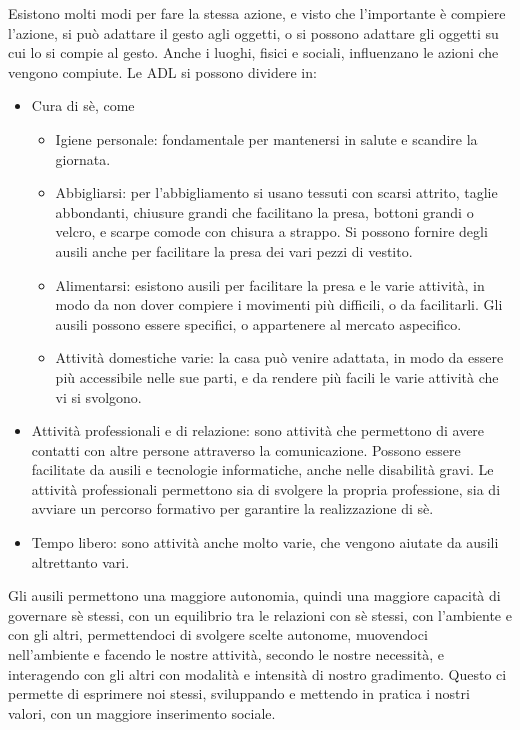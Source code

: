 Esistono molti modi per fare la stessa azione, e visto che l'importante è compiere l'azione, si può adattare il gesto agli oggetti, o si
possono adattare gli oggetti su cui lo si compie al gesto. Anche i luoghi, fisici e sociali, influenzano le azioni che vengono compiute.
Le ADL si possono dividere in:
\begin{itemize}
\item Cura di sè, come
	\begin{itemize}
	\item Igiene personale: fondamentale per mantenersi in salute e scandire la giornata.
	\item Abbigliarsi: per l'abbigliamento si usano tessuti con scarsi attrito, taglie abbondanti, chiusure grandi che facilitano la
  presa, bottoni grandi o velcro, e scarpe comode con chisura a strappo. Si possono fornire degli ausili anche per facilitare la presa
  dei vari pezzi di vestito.
	\item Alimentarsi: esistono ausili per facilitare la presa e le varie attività, in modo da non dover compiere i movimenti più
  difficili, o da facilitarli. Gli ausili possono essere specifici, o appartenere al mercato aspecifico.
	\item Attività domestiche varie: la casa può venire adattata, in modo da essere più accessibile nelle sue parti, e da rendere più
  facili le varie attività che vi si svolgono.
	\end{itemize}
\item Attività professionali e di relazione: sono attività che permettono di avere contatti con altre persone attraverso la
comunicazione. Possono essere facilitate da ausili e tecnologie informatiche, anche nelle disabilità gravi. Le attività professionali
permettono sia di svolgere la propria professione, sia di avviare un percorso formativo per garantire la realizzazione di sè.
\item Tempo libero: sono attività anche molto varie, che vengono aiutate da ausili altrettanto vari.
\end{itemize}

Gli ausili permettono una maggiore autonomia, quindi una maggiore capacità di governare sè stessi, con un equilibrio tra le relazioni
con sè stessi, con l'ambiente e con gli altri, permettendoci di svolgere scelte autonome, muovendoci nell'ambiente e facendo le nostre
attività, secondo le nostre necessità, e interagendo con gli altri con modalità e intensità di nostro gradimento.
Questo ci permette di esprimere noi stessi, sviluppando e mettendo in pratica i nostri valori, con un maggiore inserimento sociale.

